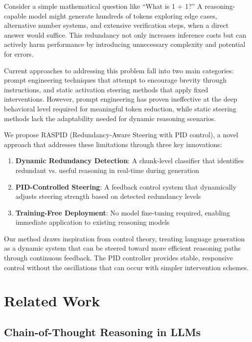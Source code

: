 \documentclass{article}
\begin{document}
Consider a simple mathematical question like ``What is 1 + 1?'' A reasoning-capable model might generate hundreds of tokens exploring edge cases, alternative number systems, and extensive verification steps, when a direct answer would suffice. This redundancy not only increases inference costs but can actively harm performance by introducing unnecessary complexity and potential for errors.

Current approaches to addressing this problem fall into two main categories: prompt engineering techniques that attempt to encourage brevity through instructions, and static activation steering methods that apply fixed interventions. However, prompt engineering has proven ineffective at the deep behavioral level required for meaningful token reduction, while static steering methods lack the adaptability needed for dynamic reasoning scenarios.

We propose RASPID (Redundancy-Aware Steering with PID control), a novel approach that addresses these limitations through three key innovations:

\begin{enumerate}
\item \textbf{Dynamic Redundancy Detection}: A chunk-level classifier that identifies redundant vs. useful reasoning in real-time during generation
\item \textbf{PID-Controlled Steering}: A feedback control system that dynamically adjusts steering strength based on detected redundancy levels
\item \textbf{Training-Free Deployment}: No model fine-tuning required, enabling immediate application to existing reasoning models
\end{enumerate}

Our method draws inspiration from control theory, treating language generation as a dynamic system that can be steered toward more efficient reasoning paths through continuous feedback. The PID controller provides stable, responsive control without the oscillations that can occur with simpler intervention schemes.

\section{Related Work}

\subsection{Chain-of-Thought Reasoning in LLMs}
\end{document}
